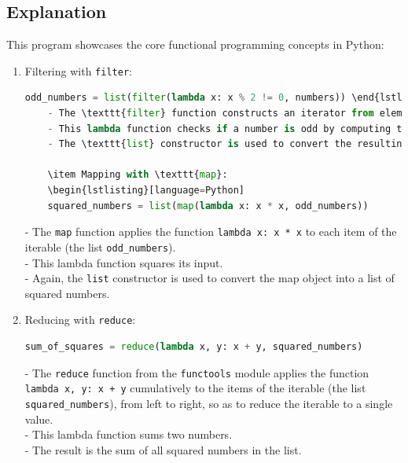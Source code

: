 \documentclass[a4paper]{article}
\begin{document}
\subsection{Explanation}
This program showcases the core functional programming concepts in Python:

\begin{enumerate}
    \item Filtering with \texttt{filter}:
    \begin{lstlisting}[language=Python]
    odd_numbers = list(filter(lambda x: x % 2 != 0, numbers)) \end{lstlisting}
    - The \texttt{filter} function constructs an iterator from elements of the iterable (in this case, the list \texttt{numbers}) for which the function \texttt{lambda x: x \% 2 != 0} returns \texttt{True}.\\
    - This lambda function checks if a number is odd by computing the remainder of the division by 2.\\
    - The \texttt{list} constructor is used to convert the resulting iterator back into a list, containing only the odd numbers.\\

    \item Mapping with \texttt{map}:
    \begin{lstlisting}[language=Python]
    squared_numbers = list(map(lambda x: x * x, odd_numbers)) \end{lstlisting}
    - The \texttt{map} function applies the function \texttt{lambda x: x * x} to each item of the iterable (the list \texttt{odd\_numbers}).\\
    - This lambda function squares its input.\\
    - Again, the \texttt{list} constructor is used to convert the map object into a list of squared numbers.\\

    \item Reducing with \texttt{reduce}:
    \begin{lstlisting}[language=Python]
    sum_of_squares = reduce(lambda x, y: x + y, squared_numbers) \end{lstlisting}
    - The \texttt{reduce} function from the \texttt{functools} module applies the function \texttt{lambda x, y: x + y} cumulatively to the items of the iterable (the list \texttt{squared\_numbers}), from left to right, so as to reduce the iterable to a single value.\\
    - This lambda function sums two numbers.\\
    - The result is the sum of all squared numbers in the list.\\
\end{enumerate}
\end{document}
